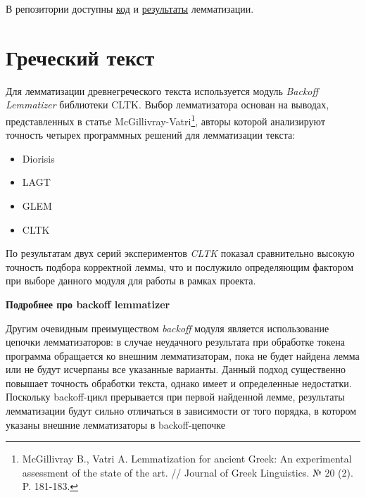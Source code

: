 \documentclass[
  letterpaper,
]{book}
\providecommand{\tightlist}{%
  \setlength{\itemsep}{0pt}\setlength{\parskip}{0pt}}\usepackage{longtable,booktabs,array}
\begin{document}
В репозитории доступны
\href{https://github.com/Drozhzhinastya/GSPC/tree/main/scripts/lemmatization}{код}
и
\href{https://github.com/Drozhzhinastya/GSPC/tree/main/lemmatization/csl}{результаты}
лемматизации.

\hypertarget{sec-lemm_grc}{%
\section{Греческий текст}\label{sec-lemm_grc}}

Для лемматизации древнегреческого текста используется модуль
\emph{Backoff Lemmatizer} библиотеки CLTK. Выбор лемматизатора основан
на выводах, представленных в статье McGillivray-Vatri\footnote{McGillivray
  B., Vatri A. Lemmatization for ancient Greek: An experimental
  assessment of the state of the art. // Journal of Greek Linguistics. №
  20 (2). P. 181-183.}, авторы которой анализируют точность четырех
программных решений для лемматизации текста:

\begin{itemize}
\tightlist
\item
  Diorisis
\item
  LAGT
\item
  GLEM
\item
  CLTK
\end{itemize}

По результатам двух серий экспериментов \emph{CLTK} показал сравнительно
высокую точность подбора корректной леммы, что и послужило определяющим
фактором при выборе данного модуля для работы в рамках проекта.

\begin{tcolorbox}[enhanced jigsaw, rightrule=.15mm, breakable, colframe=quarto-callout-note-color-frame, colback=white, leftrule=.75mm, left=2mm, arc=.35mm, opacityback=0, toprule=.15mm, bottomrule=.15mm]

\textbf{Подробнее про backoff lemmatizer}\vspace{2mm}

Другим очевидным преимуществом \emph{backoff} модуля является
использование цепочки лемматизаторов: в случае неудачного результата при
обработке токена программа обращается ко внешним лемматизаторам, пока не
будет найдена лемма или не будут исчерпаны все указанные варианты.
Данный подход существенно повышает точность обработки текста, однако
имеет и определенные недостатки. Поскольку backoff-цикл прерывается при
первой найденной лемме, результаты лемматизации будут сильно отличаться
в зависимости от того порядка, в котором указаны внешние лемматизаторы в
backoff-цепочке

\end{tcolorbox}
\end{document}
